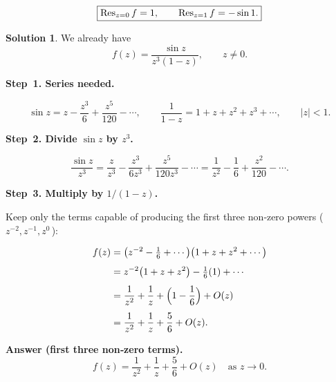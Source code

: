 \documentclass[12pt]{article}
\theoremstyle{definition} %
\newtheorem{solution}{Solution}
\theoremstyle{plain} %
\begin{document}
\bigskip
\[
   \boxed{\Res_{z=0}f=1,\qquad \Res_{z=1}f=-\sin 1.}
\]
\begin{solution}
  We already have
  \[
     f(z)=\frac{\sin z}{z^{3}(1-z)},\qquad z\neq 0 .
  \]
  
  \textbf{Step 1.  Series needed.}
  
  \[
     \sin z = z-\frac{z^{3}}{6}+\frac{z^{5}}{120}-\dotsb,
     \qquad
     \frac{1}{1-z}=1+z+z^{2}+z^{3}+\dotsb ,
     \qquad |z|<1.
  \]
  
  \bigskip
  \textbf{Step 2.  Divide \(\sin z\) by \(z^{3}\).}
  
  \[
     \frac{\sin z}{z^{3}}
     =\frac{z}{z^{3}}-\frac{z^{3}}{6z^{3}}+\frac{z^{5}}{120z^{3}}-\dotsb
     =\frac{1}{z^{2}}-\frac16+\frac{z^{2}}{120}-\dotsb .
  \]
  
  \bigskip
  \textbf{Step 3.  Multiply by \(1/(1-z)\).}
  
  Keep only the terms capable of producing the first three
  non‑zero powers (\,\(z^{-2},z^{-1},z^{0}\)\,):
  
  \[
  \begin{aligned}
  f(z)
  &=\bigl(z^{-2}-\tfrac16+\dotsb\bigr)\bigl(1+z+z^{2}+\dotsb\bigr)\\[4pt]
  &=z^{-2}\bigl(1+z+z^{2}\bigr)
     -\tfrac16(1)+\dotsb\\[4pt]
  &=\frac{1}{z^{2}}+\frac{1}{z}
     +\Bigl(1-\frac16\Bigr)+O(z)\\[4pt]
  &=\frac{1}{z^{2}}+\frac{1}{z}+\frac56+O(z).
  \end{aligned}
  \]
  
  \bigskip
  \textbf{Answer (first three non‑zero terms).}
  \[
     \boxed{\displaystyle
        f(z)=\frac{1}{z^{2}}+\frac{1}{z}+\frac56+O(z)\quad\text{as }z\to0 }.
  \]
  \end{solution}
\end{document}
